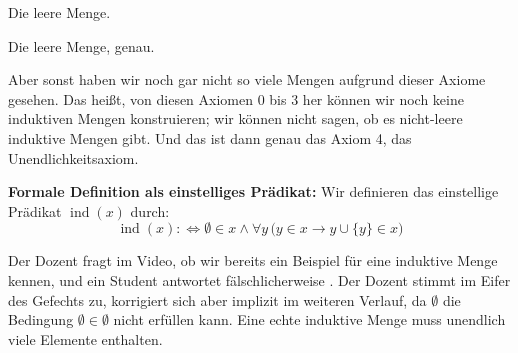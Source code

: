 \begin{student-interaction}[Studentenantwort]
Die leere Menge.
\end{student-interaction}

\begin{spoken-clean}[continued]
Die leere Menge, genau.

Aber sonst haben wir noch gar nicht so viele Mengen aufgrund dieser Axiome gesehen. Das heißt, von diesen Axiomen 0 bis 3 her können wir noch keine induktiven Mengen konstruieren; wir können nicht sagen, ob es nicht-leere induktive Mengen gibt. Und das ist dann genau das Axiom 4, das Unendlichkeitsaxiom.
\end{spoken-clean}

\begin{math-stroke}

\textbf{Formale Definition als einstelliges Prädikat:}
Wir definieren das einstellige Prädikat $\operatorname{ind}(x)$ durch:
\[
\operatorname{ind}(x) :\iff \emptyset \in x \land \forall y \, \bigl( y \in x \rightarrow y \cup \{y\} \in x \bigr)
\]

\begin{ai-note}
Der Dozent fragt im Video, ob wir bereits ein Beispiel für eine induktive Menge kennen, und ein Student antwortet fälschlicherweise . Der Dozent stimmt im Eifer des Gefechts zu, korrigiert sich aber implizit im weiteren Verlauf, da $\emptyset$ die Bedingung $\emptyset \in \emptyset$ nicht erfüllen kann. Eine echte induktive Menge muss unendlich viele Elemente enthalten.
\end{ai-note}
\end{math-stroke}


